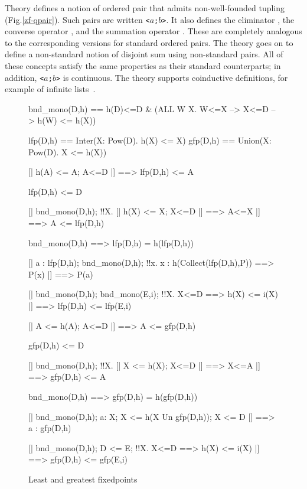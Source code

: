 Theory  defines a notion of ordered pair that admits
non-well-founded tupling (Fig.\ts\ref{zf-qpair}).  Such pairs are written
{\tt<$a$;$b$>}.  It also defines the eliminator , the
converse operator , and the summation operator
.  These are completely analogous to the corresponding
versions for standard ordered pairs.  The theory goes on to define a
non-standard notion of disjoint sum using non-standard pairs.  All of these
concepts satisfy the same properties as their standard counterparts; in
addition, {\tt<$a$;$b$>} is continuous.  The theory supports coinductive
definitions, for example of infinite lists~\cite{paulson-final}.

\begin{figure}
\begin{ttbox}
   bnd_mono(D,h) == 
                 h(D)<=D & (ALL W X. W<=X --> X<=D --> h(W) <= h(X))

        lfp(D,h) == Inter({\ttlbrace}X: Pow(D). h(X) <= X{\ttrbrace})
        gfp(D,h) == Union({\ttlbrace}X: Pow(D). X <= h(X){\ttrbrace})


 [| h(A) <= A;  A<=D |] ==> lfp(D,h) <= A

     lfp(D,h) <= D

   [| bnd_mono(D,h);  
                  !!X. [| h(X) <= X;  X<=D |] ==> A<=X 
               |] ==> A <= lfp(D,h)

     bnd_mono(D,h) ==> lfp(D,h) = h(lfp(D,h))

         [| a : lfp(D,h);  bnd_mono(D,h);
                  !!x. x : h(Collect(lfp(D,h),P)) ==> P(x)
               |] ==> P(a)

       [| bnd_mono(D,h);  bnd_mono(E,i);
                  !!X. X<=D ==> h(X) <= i(X)  
               |] ==> lfp(D,h) <= lfp(E,i)

 [| A <= h(A);  A<=D |] ==> A <= gfp(D,h)

     gfp(D,h) <= D

      [| bnd_mono(D,h);  
                  !!X. [| X <= h(X);  X<=D |] ==> X<=A
               |] ==> gfp(D,h) <= A

     bnd_mono(D,h) ==> gfp(D,h) = h(gfp(D,h))

       [| bnd_mono(D,h); a: X; X <= h(X Un gfp(D,h)); X <= D 
               |] ==> a : gfp(D,h)

       [| bnd_mono(D,h);  D <= E;
                  !!X. X<=D ==> h(X) <= i(X)  
               |] ==> gfp(D,h) <= gfp(E,i)
\end{ttbox}
\caption{Least and greatest fixedpoints} \label{zf-fixedpt}
\end{figure}

